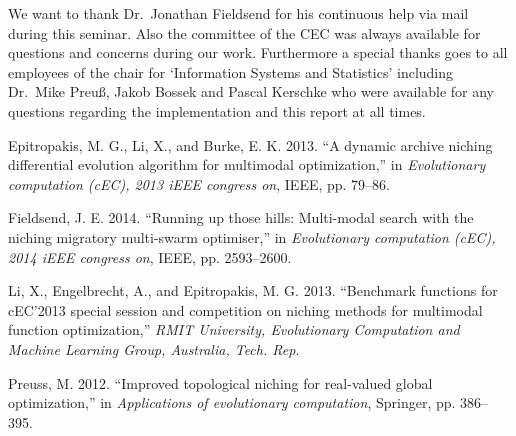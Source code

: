 \documentclass[12pt,a4paper]{article}
\begin{document}
We want to thank Dr.~Jonathan Fieldsend for his continuous help via mail
during this seminar. Also the committee of the CEC was always available
for questions and concerns during our work. Furthermore a special thanks
goes to all employees of the chair for `Information Systems and
Statistics' including Dr.~Mike Preuß, Jakob Bossek and Pascal Kerschke
who were available for any questions regarding the implementation and
this report at all times. \newpage

\hypertarget{refs}{}
\hypertarget{ref-epitropakisux5f2013}{}
Epitropakis, M. G., Li, X., and Burke, E. K. 2013. ``A dynamic archive
niching differential evolution algorithm for multimodal optimization,''
in \emph{Evolutionary computation (cEC), 2013 iEEE congress on}, IEEE,
pp. 79--86.

\hypertarget{ref-fieldsendux5f2014}{}
Fieldsend, J. E. 2014. ``Running up those hills: Multi-modal search with
the niching migratory multi-swarm optimiser,'' in \emph{Evolutionary
computation (cEC), 2014 iEEE congress on}, IEEE, pp. 2593--2600.

\hypertarget{ref-liux5f2013}{}
Li, X., Engelbrecht, A., and Epitropakis, M. G. 2013. ``Benchmark
functions for cEC'2013 special session and competition on niching
methods for multimodal function optimization,'' \emph{RMIT University,
Evolutionary Computation and Machine Learning Group, Australia, Tech.
Rep}.

\hypertarget{ref-preussux5f2012}{}
Preuss, M. 2012. ``Improved topological niching for real-valued global
optimization,'' in \emph{Applications of evolutionary computation},
Springer, pp. 386--395.
\end{document}
